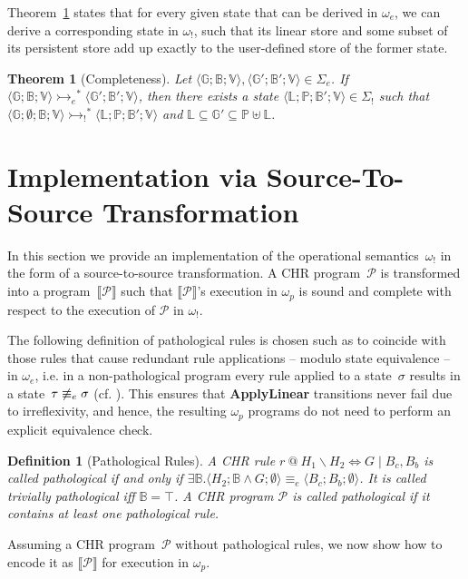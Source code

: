 \documentclass{tlp}
\newtheorem{theorem}{Theorem}
\newtheorem{definition}{Definition}[section]
\newcommand{\B}{\ensuremath{\mathbb{B}}}
\newcommand{\G}{\ensuremath{\mathbb{G}}}
\newcommand{\bL}{\ensuremath{\mathbb{L}}}
\newcommand{\mcP}{\ensuremath{\mathcal{P}}}
\newcommand{\bP}{\ensuremath{\mathbb{P}}}
\newcommand{\V}{\ensuremath{\mathbb{V}}}
\newcommand{\bbB}{\ensuremath{\mathbb{B}}}
\newcommand{\bang}{\ensuremath{!}}
\def\tuple#1{\langle #1 \rangle}
\newcommand{\stesq}[3]{\ensuremath{\tuple{#1; #2; #3}}}
\newcommand{\stbang}[4]{\ensuremath{\tuple{#1; #2; #3; #4}}}
\newcommand{\obang}{\ensuremath{{\omega_\bang}}}
\newcommand{\oesq}{\ensuremath{{\omega_e}}}
\newcommand{\Sbang}{\ensuremath{{\Sigma_{\bang}}}}
\newcommand{\Sesq}{\ensuremath{{\Sigma_e}}}
\newcommand{\eesq}{\ensuremath{\equiv_e}}
\newcommand{\der}{\ensuremath{\rightarrowtail}}
\newcommand{\derbang}{\ensuremath{\der_{\bang}}}
\newcommand{\deresq}{\ensuremath{\der_e}}
\begin{document}
Theorem~\ref{thm:completeness} states that for every given state that can be
derived in $\oesq$, we can derive a corresponding state in $\obang$, such that 
its linear store and some subset of its persistent store add up exactly to the
user-defined store of the former state.

\begin{theorem}[Completeness]\label{thm:completeness}
Let $\stesq{\G}{\B}{\V},\stesq{\G'}{\B'}{\V}\in\Sesq$. If
$
	\stesq{\G}{\B}{\V}\deresq^* \stesq{\G'}{\B'}{\V}
$,
then there exists a state
$\stbang{\bL}{\bP}{\B'}{\V}\in\Sbang$ such that
$
	\stbang{\G}{\emptyset}{\B}{\V}\derbang^* \stbang{\bL}{\bP}{\B'}{\V}
$
and 
$
	\bL \subseteq \G' \subseteq \bP\uplus\bL
$.
\end{theorem}

\section{Implementation via Source-To-Source Transformation}
\label{sec:implementation}

In this section we provide an implementation of the operational
semantics~$\obang$ in the form of a source-to-source transformation. A CHR
program~$\mcP$ is transformed into a program~$\llbracket \mcP \rrbracket$ such
that $\llbracket \mcP \rrbracket$'s execution in $\omega_p$ is sound and complete
with respect to the execution of $\mcP$ in $\obang$.

The following definition of pathological rules is chosen such as to coincide with
those rules that cause redundant rule applications -- modulo state equivalence --
in $\oesq$, i.e. in a non-pathological program every rule applied to a
state~$\sigma$ results in a state~$\tau \not \eesq \sigma$ (cf.
\cite{Betz2010}). This ensures that \textbf{ApplyLinear}
transitions never fail due to irreflexivity, and hence, the resulting $\omega_p$
programs do not need to perform an explicit equivalence check.

\begin{definition}[Pathological Rules]\label{def:pathological}
A CHR rule $r\ @\ H_1 \backslash H_2 \Leftrightarrow G \mid B_c, B_b$ is
called \emph{pathological} if and only if $\exists \bbB .
\stesq{H_2}{\bbB \land G}{\emptyset} \eesq \stesq{B_c}{B_b}{\emptyset}$.
It is called \emph{trivially pathological} iff $\bbB=\top$. A CHR
program $\mcP$ is called pathological if it contains at least one pathological
rule.
\end{definition}

Assuming a CHR program~$\mcP$ without pathological rules, we now show how to
encode it as $\llbracket \mcP \rrbracket$ for execution in $\omega_p$.
\end{document}
